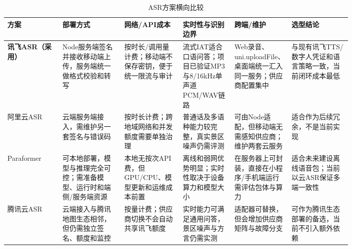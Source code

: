 \begin{landscape}
\begin{table}[H]
  \centering
  \caption{ASR方案横向比较}\label{tab:compare-asr}
  \small
  \renewcommand{\arraystretch}{1.18}
  \begin{tabularx}{\linewidth}{p{0.16\linewidth}p{0.18\linewidth}p{0.17\linewidth}p{0.15\linewidth}p{0.15\linewidth}X}
    \toprule
    方案 & 部署方式 & 网络/API成本 & 实时性与识别边界 & 跨端/维护 & 选型结论 \\
    \midrule
    \textbf{讯飞ASR（采用）} & Node服务端签名并接收移动端上传，服务端统一做格式校验和转写 & 按时长/调用量计费；移动端不保存密钥，便于统一限流与审计 & 流式IAT适合口语问答；项目已验证MP3与8/16kHz单声道PCM/WAV链路 & Web录音、uni.uploadFile、桌面端统一汇入同一服务；供应商配置集中 & 与现有讯飞TTS/数字人凭证和语言策略一致，当前闭环成本最低 \\
    \midrule
    阿里云ASR & 云端服务端接入，需维护另一套签名与错误码 & 按时长计费；跨地域网络和并发额度需要单独治理 & 普通话及多语种能力较完整，真实景区噪声仍需评测 & 可由Node适配，但移动端无需感知供应商；维护两套云服务 & 适合作为后续冗余，不是当前实现 \\
    \midrule
    Paraformer & 可本地部署，模型与推理完全可控；需准备模型、运行时和端侧/服务端资源 & 本地无按次API费，但GPU/CPU、模型更新和运维成本前置 & 离线和弱网优势明显；实时性取决于设备算力和模型大小 & 在服务器上可封装，直接在小程序/手机端运行需评估包体与算力 & 适合未来建设离线语音包；当前以云ASR保证多端一致性 \\
    \midrule
    腾讯云ASR & 云端接入与腾讯地图生态相邻，但仍需独立签名、额度和监控 & 按量计费；供应商切换不会自动共享讯飞额度 & 实时能力可满足通用问答，景区噪声与方言仍需实测 & 适配器可替换，但会增加供应商矩阵与故障分支 & 可作为腾讯生态部署的备选，当前不引入额外依赖 \\
    \bottomrule
  \end{tabularx}
\end{table}


\end{landscape}
